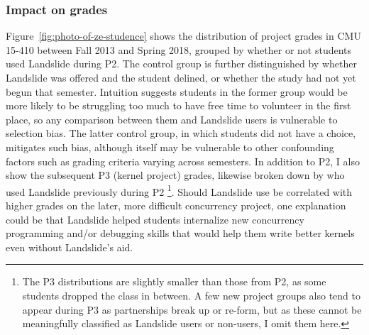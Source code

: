 \subsubsection{Impact on grades}

Figure~\ref{fig:photo-of-ze-studence} shows the distribution of project grades in CMU 15-410
between Fall 2013 and Spring 2018,
grouped by whether or not students used Landslide during P2.
The control group is further distinguished by whether Landslide was offered and the student delined,
or whether the study had not yet begun that semester.
Intuition suggests students in the former group would be more likely
to be struggling too much to have free time to volunteer in the first place,
so any comparison between them and Landslide users is vulnerable to selection bias.
The latter control group, in which students did not have a choice, mitigates such bias,
although itself may be vulnerable to other confounding factors such as grading criteria varying across semesters.
%
In addition to P2, I also show the subsequent P3 (kernel project) grades,
likewise broken down by who used Landslide previously during P2%
\footnote{The P3 distributions are slightly smaller than those from P2,
as some students dropped the class in between.
A few new project groups also tend to appear during P3 as partnerships break up or re-form,
but as these cannot be meaningfully classified as Landslide users or non-users,
I omit them here.
}.
Should Landslide use be correlated with higher grades on the later, more difficult concurrency project,
one explanation could be that Landslide helped students
internalize new concurrency programming and/or debugging skills
that would help them write better kernels even without Landslide's aid.
%



